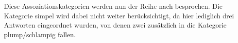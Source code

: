 Diese Assoziationskategorien werden nun der Reihe nach besprochen.
Die Kategorie \glqq simpel\grqq{} wird dabei nicht weiter berücksichtigt, da hier lediglich drei Antworten eingeordnet wurden, von denen zwei zusätzlich in die Kategorie \glqq  plump\slash schlampig\grqq{} fallen. 

